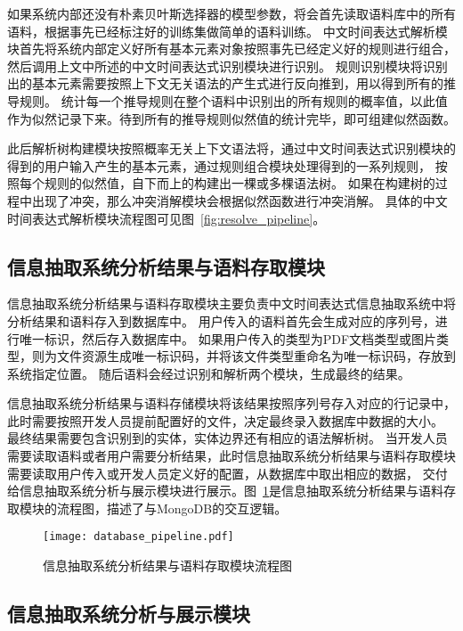 如果系统内部还没有朴素贝叶斯选择器的模型参数，将会首先读取语料库中的所有语料，根据事先已经标注好的训练集做简单的语料训练。
中文时间表达式解析模块首先将系统内部定义好所有基本元素对象按照事先已经定义好的规则进行组合，然后调用上文中所述的中文时间表达式识别模块进行识别。
规则识别模块将识别出的基本元素需要按照上下文无关语法的产生式进行反向推到，用以得到所有的推导规则。
统计每一个推导规则在整个语料中识别出的所有规则的概率值，以此值作为似然记录下来。待到所有的推导规则似然值的统计完毕，即可组建似然函数。

此后解析树构建模块按照概率无关上下文语法将，通过中文时间表达式识别模块的得到的用户输入产生的基本元素，通过规则组合模块处理得到的一系列规则，
按照每个规则的似然值，自下而上的构建出一棵或多棵语法树。
如果在构建树的过程中出现了冲突，那么冲突消解模块会根据似然函数进行冲突消解。
具体的中文时间表达式解析模块流程图可见图~\ref{fig:resolve_pipeline}。



\subsection{信息抽取系统分析结果与语料存取模块}

信息抽取系统分析结果与语料存取模块主要负责中文时间表达式信息抽取系统中将分析结果和语料存入到数据库中。
用户传入的语料首先会生成对应的序列号，进行唯一标识，然后存入数据库中。
如果用户传入的类型为PDF文档类型或图片类型，则为文件资源生成唯一标识码，并将该文件类型重命名为唯一标识码，存放到系统指定位置。
随后语料会经过识别和解析两个模块，生成最终的结果。

信息抽取系统分析结果与语料存储模块将该结果按照序列号存入对应的行记录中，此时需要按照开发人员提前配置好的文件，决定最终录入数据库中数据的大小。
最终结果需要包含识别到的实体，实体边界还有相应的语法解析树。
当开发人员需要读取语料或者用户需要分析结果，此时信息抽取系统分析结果与语料存取模块需要读取用户传入或开发人员定义好的配置，从数据库中取出相应的数据，
交付给信息抽取系统分析与展示模块进行展示。图~\ref{fig:datebase_pipeline}是信息抽取系统分析结果与语料存取模块的流程图，描述了与MongoDB的交互逻辑。

\begin{figure}[h]
  \centering
  \texttt{[image: database\_pipeline.pdf]}
  \caption{信息抽取系统分析结果与语料存取模块流程图}
  \label{fig:datebase_pipeline}
\end{figure}

\subsection{信息抽取系统分析与展示模块}

